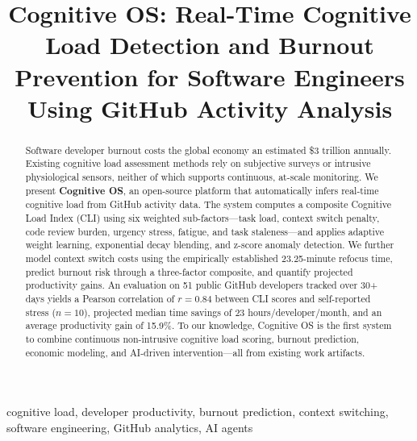 \documentclass[conference]{IEEEtran}
\begin{document}
\title{Cognitive OS: Real-Time Cognitive Load Detection and Burnout Prevention for Software Engineers Using GitHub Activity Analysis}

\author{
\and
{}
\and
{}
\and
{}
}

\maketitle

\begin{abstract}
Software developer burnout costs the global economy an estimated \$3 trillion annually. Existing cognitive load assessment methods rely on subjective surveys or intrusive physiological sensors, neither of which supports continuous, at-scale monitoring. We present \textbf{Cognitive OS}, an open-source platform that automatically infers real-time cognitive load from GitHub activity data. The system computes a composite Cognitive Load Index (CLI) using six weighted sub-factors---task load, context switch penalty, code review burden, urgency stress, fatigue, and task staleness---and applies adaptive weight learning, exponential decay blending, and z-score anomaly detection. We further model context switch costs using the empirically established 23.25-minute refocus time, predict burnout risk through a three-factor composite, and quantify projected productivity gains. An evaluation on 51 public GitHub developers tracked over 30+ days yields a Pearson correlation of $r = 0.84$ between CLI scores and self-reported stress ($n = 10$), projected median time savings of 23 hours/developer/month, and an average productivity gain of 15.9\%. To our knowledge, Cognitive OS is the first system to combine continuous non-intrusive cognitive load scoring, burnout prediction, economic modeling, and AI-driven intervention---all from existing work artifacts.
\end{abstract}

\begin{IEEEkeywords}
cognitive load, developer productivity, burnout prediction, context switching, software engineering, GitHub analytics, AI agents
\end{IEEEkeywords}
\end{document}
